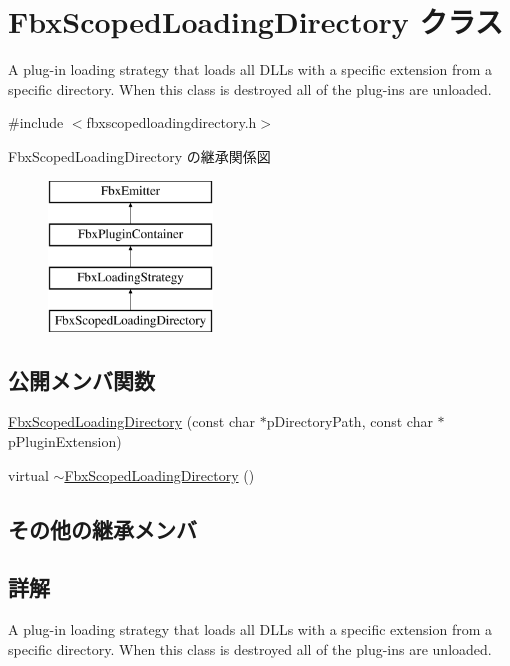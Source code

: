 \hypertarget{class_fbx_scoped_loading_directory}{}\section{Fbx\+Scoped\+Loading\+Directory クラス}
\label{class_fbx_scoped_loading_directory}


A plug-\/in loading strategy that loads all D\+L\+Ls with a specific extension from a specific directory. When this class is destroyed all of the plug-\/ins are unloaded.  




{\ttfamily \#include $<$fbxscopedloadingdirectory.\+h$>$}

Fbx\+Scoped\+Loading\+Directory の継承関係図\begin{figure}[H]
\begin{center}
\leavevmode
\includegraphics[height=4.000000cm]{class_fbx_scoped_loading_directory}
\end{center}
\end{figure}
\subsection*{公開メンバ関数}
\begin{DoxyCompactItemize}
\item 
\hyperlink{class_fbx_scoped_loading_directory_a9679c872ae08e0a76f9b63a7dc899985}{Fbx\+Scoped\+Loading\+Directory} (const char $\ast$p\+Directory\+Path, const char $\ast$p\+Plugin\+Extension)
\item 
virtual \hyperlink{class_fbx_scoped_loading_directory_ae8a3e3331bf58edef910021442af358b}{$\sim$\+Fbx\+Scoped\+Loading\+Directory} ()
\end{DoxyCompactItemize}
\subsection*{その他の継承メンバ}


\subsection{詳解}
A plug-\/in loading strategy that loads all D\+L\+Ls with a specific extension from a specific directory. When this class is destroyed all of the plug-\/ins are unloaded. 

